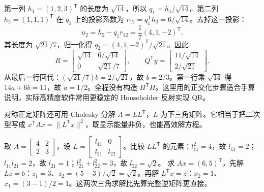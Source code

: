 \begin{examplebox}[算例 对同一组三点数据手算 QR]
第一列 $h_1=(1,2,3)^\mathsf T$ 的长度为 $\sqrt{14}$，所以 $q_1=h_1/\sqrt{14}$。第二列 $h_2=(1,1,1)^\mathsf T$ 在 $q_1$ 上的投影系数为 $r_{12}=q_1^\mathsf Th_2=6/\sqrt{14}$。去掉这一投影：
\[
 u_2=h_2-q_1r_{12}=\frac17(4,1,-2)^\mathsf T.
\]
其长度为 $\sqrt{21}/7$，归一化得 $q_2=(4,1,-2)^\mathsf T/\sqrt{21}$。因此
\[
 R=\begin{bmatrix}\sqrt{14}&6/\sqrt{14}\\0&\sqrt{21}/7\end{bmatrix},
 \qquad Q^\mathsf Ty=\begin{bmatrix}11/\sqrt{14}\\2/\sqrt{21}\end{bmatrix}.
\]
从最后一行回代：$(\sqrt{21}/7)b=2/\sqrt{21}$，故 $b=2/3$。第一行乘 $\sqrt{14}$ 得 $14a+6b=11$，故 $a=1/2$。全程没有构造 $H^\mathsf TH$。这里用的正交化步骤适合手算说明，实际高精度软件常用更稳定的 Householder 反射实现 QR。
\end{examplebox}

对称正定矩阵还可用 Cholesky 分解 $A=LL^\mathsf T$，$L$ 为下三角矩阵。它相当于把二次型写成 $x^\mathsf TAx=\|L^\mathsf Tx\|^2$，既显示能量非负，也能高效解方程。
\begin{examplebox}[算例 三角回代代替显式求逆]
取 $A=\begin{bmatrix}4&2\\2&3\end{bmatrix}$，设 $L=\begin{bmatrix}l_{11}&0\\l_{21}&l_{22}\end{bmatrix}$。比较 $LL^\mathsf T$ 的元素：$l_{11}^2=4$，故 $l_{11}=2$；$l_{11}l_{21}=2$，故 $l_{21}=1$；$l_{21}^2+l_{22}^2=3$，故 $l_{22}=\sqrt2$。
求 $Ax=(6,5)^\mathsf T$，先解 $Lz=b$：$z_1=3$、$z_2=(5-3)/\sqrt2=\sqrt2$。再解 $L^\mathsf Tx=z$：$x_2=1$、$x_1=(3-1)/2=1$。这两次三角求解比先算完整逆矩阵更直接。
\end{examplebox}

